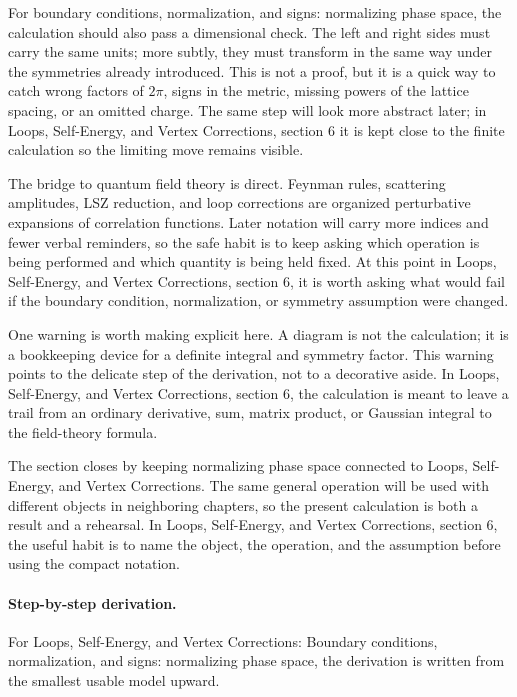 For boundary conditions, normalization, and signs: normalizing phase space, the calculation should also pass a dimensional check.  The left and right sides must carry the same units; more subtly, they must transform in the same way under the symmetries already introduced.  This is not a proof, but it is a quick way to catch wrong factors of \(2\pi\), signs in the metric, missing powers of the lattice spacing, or an omitted charge.  The same step will look more abstract later; in Loops, Self-Energy, and Vertex Corrections, section 6 it is kept close to the finite calculation so the limiting move remains visible.

The bridge to quantum field theory is direct.  Feynman rules, scattering amplitudes, LSZ reduction, and loop corrections are organized perturbative expansions of correlation functions.  Later notation will carry more indices and fewer verbal reminders, so the safe habit is to keep asking which operation is being performed and which quantity is being held fixed.  At this point in Loops, Self-Energy, and Vertex Corrections, section 6, it is worth asking what would fail if the boundary condition, normalization, or symmetry assumption were changed.

One warning is worth making explicit here.  A diagram is not the calculation; it is a bookkeeping device for a definite integral and symmetry factor.  This warning points to the delicate step of the derivation, not to a decorative aside.  In Loops, Self-Energy, and Vertex Corrections, section 6, the calculation is meant to leave a trail from an ordinary derivative, sum, matrix product, or Gaussian integral to the field-theory formula.

The section closes by keeping normalizing phase space connected to Loops, Self-Energy, and Vertex Corrections.  The same general operation will be used with different objects in neighboring chapters, so the present calculation is both a result and a rehearsal.  In Loops, Self-Energy, and Vertex Corrections, section 6, the useful habit is to name the object, the operation, and the assumption before using the compact notation.



\paragraph{Step-by-step derivation.}

For Loops, Self-Energy, and Vertex Corrections: Boundary conditions, normalization, and signs: normalizing phase space, the derivation is written from the smallest usable model upward.

